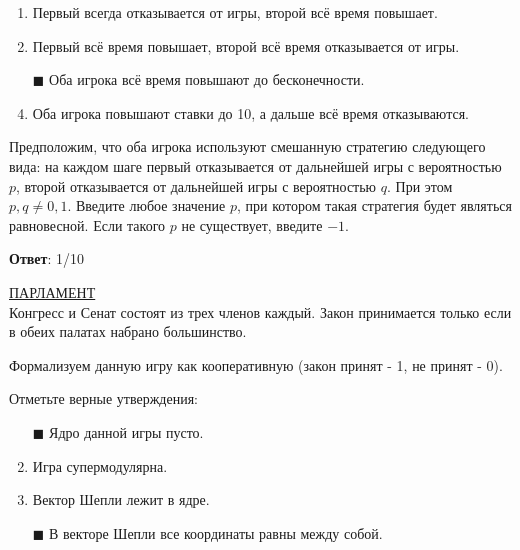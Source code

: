 \begin{enumerate}[label=$\square$]
	
	
	
	\item Первый всегда отказывается от игры, второй всё время повышает.
	\item Первый всё время повышает, второй всё время отказывается от игры.
	\item[$\blacksquare$] Оба игрока всё время повышают до бесконечности.
	\item Оба игрока повышают ставки до 10, а дальше всё время отказываются.
\end{enumerate}

\task
Предположим, что оба игрока используют смешанную стратегию следующего вида: на каждом шаге первый отказывается от дальнейшей игры с вероятностью $p$, второй отказывается от дальнейшей игры с вероятностью $q$. При этом $p,q \neq 0,1$. Введите любое значение $p$, при котором такая стратегия будет являться равновесной. Если такого $p$ не существует, введите $-1$.

\textbf{Ответ}: %
1/10

\task
\underline{ПАРЛАМЕНТ} \\

Конгресс и Сенат состоят из трех членов каждый. Закон принимается только если в обеих палатах набрано большинство.

Формализуем данную игру как кооперативную (закон принят - 1, не принят - 0).

Отметьте верные утверждения:

\begin{enumerate}[label=$\square$]
	\item[$\blacksquare$] Ядро данной игры пусто.
	\item Игра супермодулярна.
	\item Вектор Шепли лежит в ядре.
	\item[$\blacksquare$] В векторе Шепли все координаты равны между собой.
\end{enumerate}

